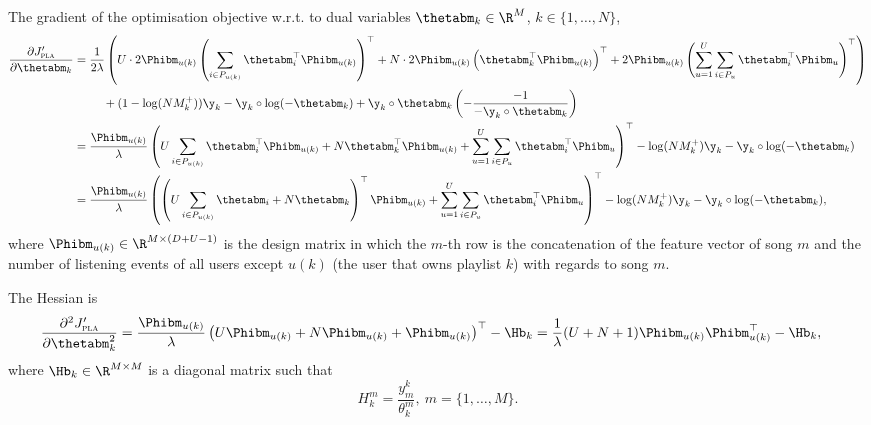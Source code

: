 The gradient of the optimisation objective w.r.t. to dual variables $\thetabm_k \in \R^{M}$, $k \in \{1,\dots,N\}$,
\begin{equation*}
\begin{aligned}
\frac{\partial J_\textsc{pla}'}{\partial \thetabm_k}
&= \frac{1}{2 \lambda} \left( U \cdot 2 \Phibm_{u(k)} \left(\sum_{i \in P_{u(k)}} \thetabm_i^\top \Phibm_{u(k)} \right)^\top 
   + N \cdot 2 \Phibm_{u(k)} \left( \thetabm_k^\top \Phibm_{u(k)} \right)^\top
   + 2 \Phibm_{u(k)} \left(\sum_{u=1}^U \sum_{i \in P_u} \thetabm_i^\top \Phibm_u \right)^\top \right) \\
& \hspace{2.5em}
   + (1 - \log(N M_k^+)) \y_k - \y_k \circ \log(-\thetabm_k) + \y_k \circ \thetabm_k \left( -\frac{-1}{-\y_k \circ \thetabm_k} \right) \\
&= \frac{\Phibm_{u(k)}}{\lambda} \left( U \sum_{i \in P_{u(k)}} \thetabm_i^\top \Phibm_{u(k)}
   + N \thetabm_k^\top \Phibm_{u(k)} 
   + \sum_{u=1}^U \sum_{i \in P_u} \thetabm_i^\top \Phibm_u \right)^\top
   - \log(N M_k^+) \y_k - \y_k \circ \log(-\thetabm_k) \\
&= \frac{\Phibm_{u(k)}}{\lambda} \left( \left( U \sum_{i \in P_{u(k)}} \thetabm_i + N \thetabm_k \right)^\top \Phibm_{u(k)} 
   + \sum_{u=1}^U \sum_{i \in P_u} \thetabm_i^\top \Phibm_u \right)^\top
   - \log(N M_k^+) \y_k - \y_k \circ \log(-\thetabm_k),
\end{aligned}
\end{equation*}
where $\Phibm_{u(k)} \in \R^{M \times (D + U - 1)}$ is the design matrix in which 
the $m$-th row is the concatenation of the feature vector of song $m$ 
and the number of listening events of all users except $u(k)$ (the user that owns playlist $k$) with regards to song $m$.

The Hessian is
\begin{equation*}
\begin{aligned}
\frac{\partial^2 J_\textsc{pla}'}{\partial \thetabm_k^2}
&= \frac{\Phibm_{u(k)}}{\lambda} \left( U \Phibm_{u(k)} + N \Phibm_{u(k)} + \Phibm_{u(k)} \right)^\top - \Hb_k
 = \frac{1}{\lambda} (U + N + 1) \Phibm_{u(k)} \Phibm_{u(k)}^\top - \Hb_k,
\end{aligned}
\end{equation*}
where $\Hb_k \in \R^{M \times M}$ is a diagonal matrix such that
\begin{equation*}
H_k^m = \frac{y_m^k}{\theta_k^m}, \ m = \{1,\dots,M\}.
\end{equation*}


